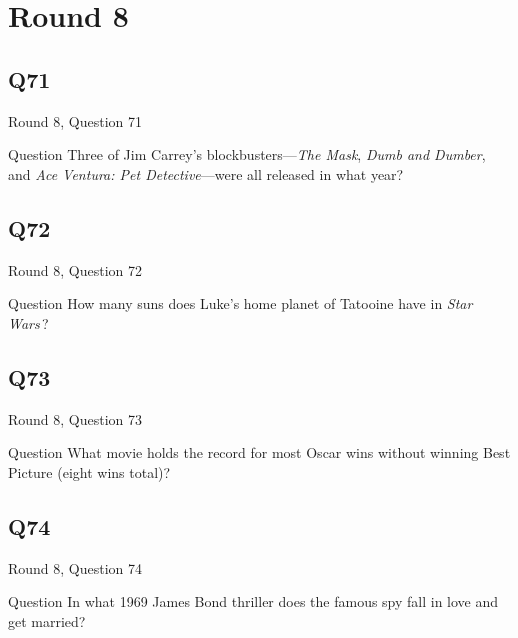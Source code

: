 \documentclass[11pt]{beamer}
\begin{document}
\section{Round 8}
    

\subsection*{Q71}
\begin{frame}[t]{Round 8, Question 71}
\vspace{2em}
\begin{block}{Question}
Three of Jim Carrey's blockbusters—\emph{The Mask}, \emph{Dumb and Dumber}, and \emph{Ace Ventura: Pet Detective}—were all released in what year?
\end{block}
\end{frame}
    

\subsection*{Q72}
\begin{frame}[t]{Round 8, Question 72}
\vspace{2em}
\begin{block}{Question}
How many suns does Luke's home planet of Tatooine have in \emph{Star Wars}\,?
\end{block}
\end{frame}
    

\subsection*{Q73}
\begin{frame}[t]{Round 8, Question 73}
\vspace{2em}
\begin{block}{Question}
What movie holds the record for most Oscar wins without winning Best Picture (eight wins total)?
\end{block}
\end{frame}
    

\subsection*{Q74}
\begin{frame}[t]{Round 8, Question 74}
\vspace{2em}
\begin{block}{Question}
In what 1969 James Bond thriller does the famous spy fall in love and get married?
\end{block}
\end{frame}
    
\end{document}
